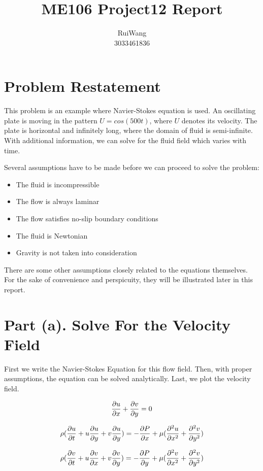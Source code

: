 \documentclass{article}
\title{ME106 Project12 Report}
\author{\large Rui\hspace{0.5cm}Wang \\ 3033461836}
\date{}
\begin{document}
\maketitle
\vspace{4cm}
\tableofcontents
\clearpage
\section{Problem Restatement}
This problem is an example where Navier-Stokes equation is used. An oscillating plate is moving in the pattern $U = cos(500t)$, where $U$ denotes its velocity. The plate is horizontal and infinitely long, where the domain of fluid is semi-infinite. With additional information, we can solve for the fluid field which varies with time.

Several assumptions have to be made before we can proceed to solve the problem:
\begin{itemize}
  \item The fluid is incompressible
  \item The flow is always laminar
  \item The flow satisfies no-slip boundary conditions
  \item The fluid is Newtonian
  \item Gravity is not taken into consideration
\end{itemize}
There are some other assumptions closely related to the equations themselves. For the sake of convenience and perspicuity, they will be illustrated later in this report.

\section{Part (a). Solve For the Velocity Field}
First we write the Navier-Stokes Equation for this flow field. Then, with proper assumptions, the equation can be solved analytically. Last, we plot the velocity field.

\begin{align}
\pdv{u}{x} + \pdv{v}{y} = 0
  \label{eq:incompressibility}
\end{align}

\begin{align}
\rho ( \pdv{u}{t} + u\pdv{u}{y} + v\pdv{u}{y} ) = -\pdv{P}{x} + \mu (\pdv[2]{u}{x} + \pdv[2]{v}{y})
  \label{eq:N-S1}
\end{align}

\begin{align}
\rho ( \pdv{v}{t} + u\pdv{v}{x} + v\pdv{v}{y} ) = -\pdv{P}{y} + \mu (\pdv[2]{v}{x} + \pdv[2]{v}{y})
  \label{eq:N-S2}
\end{align}
\end{document}
